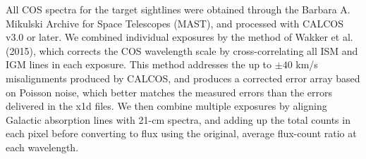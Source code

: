 \documentclass[iop]{emulateapj-rtx4}
\begin{document}
All COS spectra for the target sightlines were obtained through the Barbara A. Mikulski Archive for Space Telescopes (MAST), and processed with CALCOS v3.0 or later. We combined individual exposures by the method of Wakker et al. (2015), which corrects the COS wavelength scale by cross-correlating all ISM and IGM lines in each exposure. This method addresses the up to $\pm40$ km/s misalignments produced by CALCOS, and produces a corrected error array based on Poisson noise, which better matches the measured errors than the errors delivered in the x1d files. We then combine multiple exposures by aligning Galactic absorption lines with 21-cm spectra, and adding up the total counts in each pixel before converting to flux using the original, average flux-count ratio at each wavelength.

\begin{figure}[ht!]
\centering

\end{figure}
\end{document}
